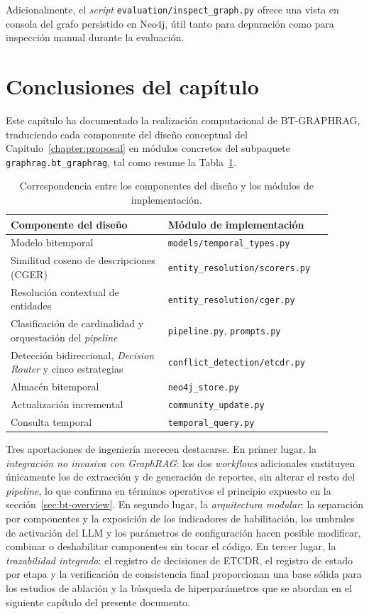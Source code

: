 Adicionalmente, el \emph{script} \texttt{evaluation/inspect\_graph.py} ofrece una vista en consola del grafo persistido en Neo4j, útil tanto para depuración como para inspección manual durante la evaluación.

\section{Conclusiones del capítulo}\label{sec:impl-conclusions}

Este capítulo ha documentado la realización computacional de BT-GRAPHRAG, traduciendo cada componente del diseño conceptual del Capítulo~\ref{chapter:proposal} en módulos concretos del subpaquete \texttt{graphrag.bt\_graphrag}, tal como resume la Tabla~\ref{tab:impl-design-to-module}.

\begin{table}[H]
\centering
\small
\begin{tabular}{p{0.45\linewidth}p{0.45\linewidth}}
\hline
\textbf{Componente del diseño} & \textbf{Módulo de implementación} \\ \hline
Modelo bitemporal & \texttt{models/temporal\_types.py} \\
Similitud coseno de descripciones (CGER) & \texttt{entity\_resolution/scorers.py} \\
Resolución contextual de entidades & \texttt{entity\_resolution/cger.py} \\
Clasificación de cardinalidad y orquestación del \emph{pipeline} & \texttt{pipeline.py}, \texttt{prompts.py} \\
Detección bidireccional, \emph{Decision Router} y cinco estrategias & \texttt{conflict\_detection/etcdr.py} \\
Almacén bitemporal & \texttt{neo4j\_store.py} \\
Actualización incremental & \texttt{community\_update.py} \\
Consulta temporal & \texttt{temporal\_query.py} \\ \hline
\end{tabular}
\caption{Correspondencia entre los componentes del diseño y los módulos de implementación.}
\label{tab:impl-design-to-module}
\end{table}

Tres aportaciones de ingeniería merecen destacarse. En primer lugar, la \emph{integración no invasiva con GraphRAG}: los dos \emph{workflows} adicionales sustituyen únicamente los de extracción y de generación de reportes, sin alterar el resto del \emph{pipeline}, lo que confirma en términos operativos el principio expuesto en la sección~\ref{sec:bt-overview}. En segundo lugar, la \emph{arquitectura modular}: la separación por componentes y la exposición de los indicadores de habilitación, los umbrales de activación del LLM y los parámetros de configuración hacen posible modificar, combinar o deshabilitar componentes sin tocar el código. En tercer lugar, la \emph{trazabilidad integrada}: el registro de decisiones de ETCDR, el registro de estado por etapa y la verificación de consistencia final proporcionan una base sólida para los estudios de ablación y la búsqueda de hiperparámetros que se abordan en el siguiente capítulo del presente documento.
